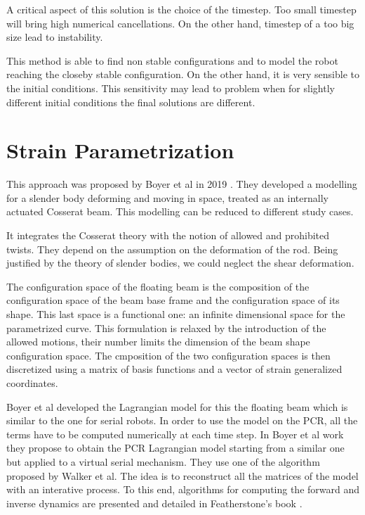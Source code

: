 \documentclass{thesisreport}
\begin{document}
 A critical aspect of this solution is the choice of the timestep. Too small timestep will bring high numerical cancellations. On the other hand, timestep of a too big size lead to instability. 
 
 This method is able to find non stable configurations and to model the robot reaching the closeby stable configuration. On the other hand, it is very sensible to the initial conditions. This sensitivity may lead to problem when for slightly different initial conditions the final solutions are different. 
 
 
 \section{Strain Parametrization}
 
 This approach was proposed by Boyer et al in 2019 \cite{boyer_dynamics_2019}. They developed a modelling for a slender body deforming and moving in space, treated as an internally actuated Cosserat beam. This modelling can be reduced to different study cases. 
 
 It integrates the Cosserat theory with the notion of allowed and prohibited twists. They depend on the assumption on the deformation of the rod. Being justified by the theory of slender bodies, we could neglect the shear deformation.
 
 The configuration space of the floating beam is the composition of the configuration space of the beam base frame and the configuration space of its shape. This last space is a functional one: an infinite dimensional space for the parametrized curve. 
 This formulation is relaxed by the introduction of the allowed motions, their number limits the dimension of the beam shape configuration space. 
 The cmposition of the two configuration spaces is then discretized using a matrix of basis functions and a vector of strain generalized coordinates. 
 
 Boyer et al\cite{boyer_dynamics_2019} developed the Lagrangian model for this the floating beam which is similar to the one for serial robots. 
 In order to use the model on the PCR, all the terms have to be computed numerically at each time step. In Boyer et al work\cite{boyer_dynamics_2019} they propose to obtain the PCR Lagrangian model starting from a similar one but applied to a virtual serial mechanism. They use one of the algorithm proposed by Walker et al\cite{walker_efficient_1982}. The idea is to reconstruct all the matrices of the model with an interative process. To this end, algorithms for computing the forward and inverse dynamics are presented and detailed in Featherstone's book \cite{featherstone_rigid_2008}.
\end{document}
